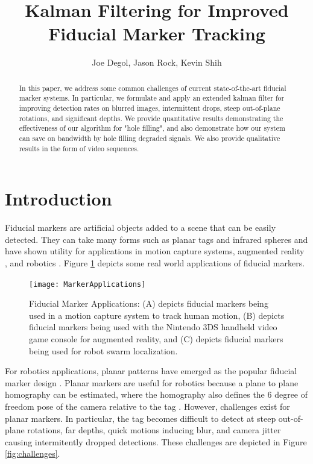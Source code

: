 \documentclass[letterpaper,10pt,conference]{IEEEtran}
\title{Kalman Filtering for Improved Fiducial Marker Tracking}
\author{Joe Degol, Jason Rock, Kevin Shih}
\begin{document}
\maketitle
\thispagestyle{empty}
\pagestyle{empty}



\begin{abstract}
In this paper, we address some common challenges of current state-of-the-art fiducial marker systems. In particular, we formulate and apply an extended kalman filter for improving detection rates on blurred images, intermittent drops, steep out-of-plane rotations, and significant depths. We provide quantitative results demonstrating the effectiveness of our algorithm for "hole filling", and also demonstrate how our system can save on bandwidth by hole filling degraded signals. We also provide qualitative results in the form of video sequences.
\end{abstract}



\section{Introduction}
Fiducial markers are artificial objects added to a scene that can be easily detected. They can take many forms such as planar tags and infrared spheres and have shown utility for applications in motion capture systems, augmented reality \cite{Fiala2005}\cite{Fiala2010}, and robotics \cite{Olson2011}. Figure \ref{fig:applications} depicts some real world applications of fiducial markers.

\begin{figure}
\centering
\texttt{[image: MarkerApplications]}
\caption{Fiducial Marker Applications: (A) depicts fiducial markers being used in a motion capture system to track human motion, (B) depicts fiducial markers being used with the Nintendo 3DS handheld video game console for augmented reality, and (C) depicts fiducial markers being used for robot swarm localization.}
\label{fig:applications}
\end{figure}

For robotics applications, planar patterns have emerged as the popular fiducial marker design \cite{Sattar2007,Olson2011}. Planar markers are useful for robotics because a plane to plane homography can be estimated, where the homography also defines the 6 degree of freedom pose of the camera relative to the tag \cite{Olson2011}. However, challenges exist for planar markers. In particular, the tag becomes difficult to detect at steep out-of-plane rotations, far depths, quick motions inducing blur, and camera jitter causing intermitently dropped detections. These challenges are depicted in Figure \ref{fig:challenges}.
\end{document}

